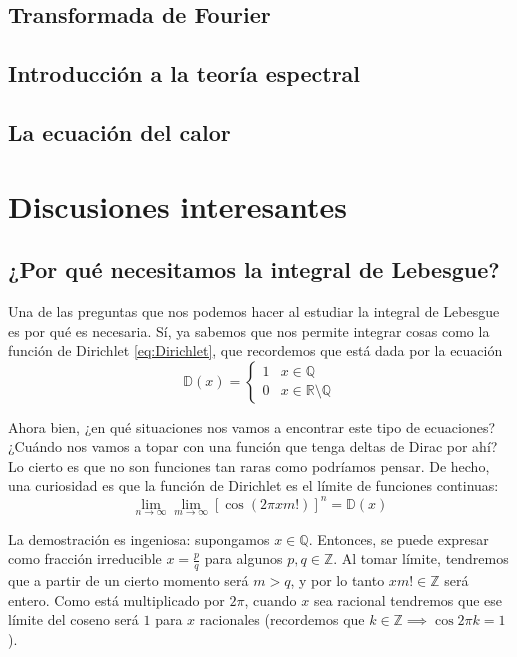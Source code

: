 \documentclass[nochap,palatino]{apuntes}
\begin{document}
\section{Transformada de Fourier}

\section{Introducción a la teoría espectral}

\section{La ecuación del calor}

\appendix

\chapter{Discusiones interesantes}
\label{chap:Discusiones}

\section{¿Por qué necesitamos la integral de Lebesgue?}
\label{sec:MotivacionLebesgue}

Una de las preguntas que nos podemos hacer al estudiar la integral de Lebesgue es por qué es necesaria. Sí, ya sabemos que nos permite integrar cosas como la función de Dirichlet \eqref{eq:Dirichlet}, que recordemos que está dada por la ecuación \[ \mathbb{D}(x) = \begin{cases} 1 & x ∈ ℚ \\ 0 & x ∈ ℝ \setminus ℚ \end{cases} \]

Ahora bien, ¿en qué situaciones nos vamos a encontrar este tipo de ecuaciones? ¿Cuándo nos vamos a topar con una función que tenga deltas de Dirac por ahí? Lo cierto es que no son funciones tan raras como podríamos pensar. De hecho, una curiosidad es que la función de Dirichlet es el límite de funciones continuas: \[ \lim_{n\to ∞} \lim_{m\to ∞} \left[\cos (2πxm!)\right]^n = \mathbb{D}(x) \]

La demostración es ingeniosa: supongamos $x ∈ ℚ$. Entonces, se puede expresar como fracción irreducible $x = \frac{p}{q}$ para algunos $p,q ∈ ℤ$. Al tomar límite, tendremos que a partir de un cierto momento será $m > q$, y por lo tanto $xm! ∈ ℤ$ será entero. Como está multiplicado por $2π$, cuando $x$ sea racional tendremos que ese límite del coseno será $1$ para $x$ racionales (recordemos que $k ∈ ℤ\implies \cos 2πk = 1$).
\end{document}
